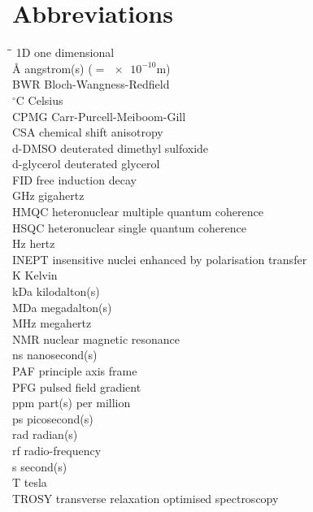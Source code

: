 \chapter{Abbreviations}%


\begin{tabbing}
\hspace{0.5\parindent}\=\hspace{0.12\paperwidth}\=\+\kill
1D\> one dimensional\\
$\si{\angstrom}$\> angstrom(s) ($= \num{e-10} \si{\meter}$)\\
BWR\> Bloch-Wangness-Redfield\\
$^{\circ}$C\> Celsius\\
CPMG\> Carr-Purcell-Meiboom-Gill\\
CSA\> chemical shift anisotropy\\
d-DMSO\> deuterated dimethyl sulfoxide\\
d-glycerol\> deuterated glycerol\\
FID\> free induction decay\\
GHz\> gigahertz\\
HMQC\> heteronuclear multiple quantum coherence\\
HSQC\> heteronuclear single quantum coherence \\
Hz\> hertz\\
INEPT\> insensitive nuclei enhanced by polarisation transfer\\
K\> Kelvin\\
kDa\> kilodalton(s)\\
MDa\> megadalton(s)\\
MHz\> megahertz\\
NMR\> nuclear magnetic resonance\\
ns\> nanosecond(s)\\
PAF\> principle axis frame \\
PFG\> pulsed field gradient\\
ppm\> part(s) per million\\
ps\> picosecond(s)\\
rad\> radian(s)\\
rf\> radio-frequency\\
s\> second(s)\\
T\> tesla \\
TROSY\> transverse relaxation optimised spectroscopy
\end{tabbing}